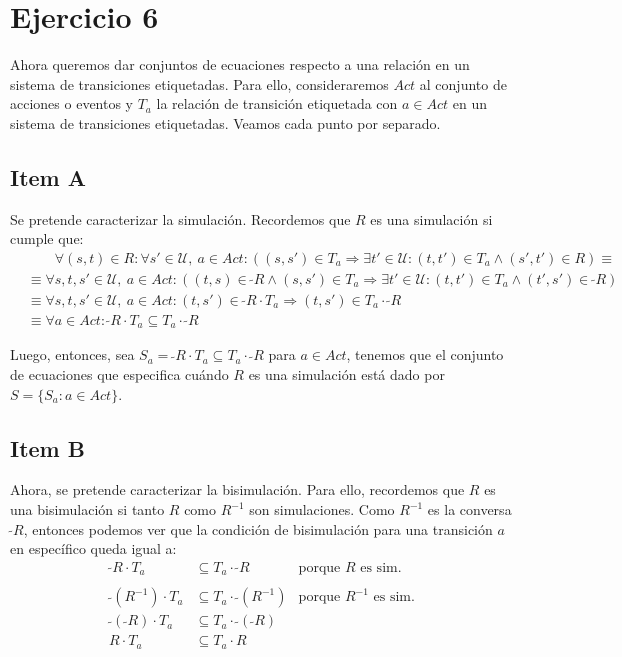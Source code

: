 \documentclass{article}
\newcommand{\U}{\mathcal{U}}
\newcommand{\conv}[1]{\ \tilde{}#1}
\begin{document}
\section*{Ejercicio 6}
Ahora queremos dar conjuntos de ecuaciones respecto a una relación en un sistema de transiciones etiquetadas.
Para ello, consideraremos $Act$ al conjunto de acciones o eventos y $T_a$ la relación de transición etiquetada con $a \in Act$ en un sistema de transiciones etiquetadas.
Veamos cada punto por separado.

\subsection*{Item A}
Se pretende caracterizar la simulación.
Recordemos que $R$ es una simulación si cumple que:
\begin{equation*}
  \begin{aligned}
    &\qquad \forall (s, t) \in R : \forall s' \in \U,\ a \in Act : ((s, s') \in T_a \Rightarrow \exists t' \in \U : (t, t') \in T_a \land (s', t') \in R) \equiv \\ 
    &\equiv \forall s, t, s' \in \U,\ a \in Act : ((t, s) \in \conv{R} \land (s, s') \in T_a \Rightarrow \exists t' \in \U : (t, t') \in T_a \land (t', s') \in \conv{R}) \\ 
    &\equiv \forall s, t, s' \in \U,\ a \in Act : (t, s') \in \conv{R} \cdot T_a \Rightarrow (t, s') \in T_a \cdot \conv{R} \\ 
    &\equiv \forall a \in Act : \conv{R} \cdot T_a \subseteq T_a \cdot \conv{R}
  \end{aligned}
\end{equation*}

Luego, entonces, sea $S_a = \conv{R} \cdot T_a \subseteq T_a \cdot \conv{R}$ para $a \in Act$, tenemos que el conjunto de ecuaciones que especifica cuándo $R$ es una simulación está dado por $S = \{S_a : a \in Act\}$.

\subsection*{Item B}
Ahora, se pretende caracterizar la bisimulación.
Para ello, recordemos que $R$ es una bisimulación si tanto $R$ como $R^{-1}$ son simulaciones.
Como $R^{-1}$ es la conversa $\conv{R}$, entonces podemos ver que la condición de bisimulación para una transición $a$ en específico queda igual a:
\begin{equation*}
  \begin{aligned}
    \conv{R} \cdot T_a &\subseteq T_a \cdot \conv{R} &\text{porque }R\text{ es sim.} \\ 
    \\ 
    \conv{(R^{-1})} \cdot T_a &\subseteq T_a \cdot \conv{(R^{-1})} &\text{porque } R^{-1}\text{ es sim.} \\ 
    \conv{(\conv{R})} \cdot T_a &\subseteq T_a \cdot \conv{(\conv{R})} \\ 
    R \cdot T_a &\subseteq T_a \cdot R 
  \end{aligned}
\end{equation*}
\end{document}
